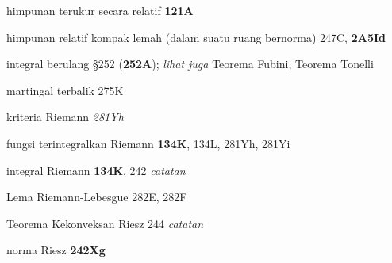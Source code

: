 himpunan terukur secara relatif {\bf 121A}



himpunan relatif kompak lemah (dalam suatu ruang bernorma) 247C,
{\bf 2A5Id}









integral berulang \S252 ({\bf 252A}); 
  {\it lihat juga} Teorema Fubini, Teorema Tonelli

































martingal terbalik 275K







kriteria Riemann {\it 281Yh}


fungsi terintegralkan Riemann {\bf 134K}, 134L,
  281Yh, 281Yi

integral Riemann {\bf 134K},
  242 {\it catatan}
  

Lema Riemann-Lebesgue 282E, 282F




Teorema Kekonveksan Riesz 244 {\it catatan}






norma Riesz {\bf 242Xg}






